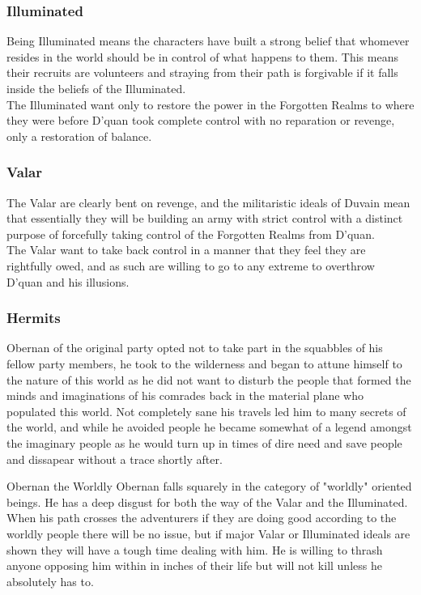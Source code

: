 \documentclass[10pt,twoside,twocolumn]{article}
\begin{document}
\subsubsection{Illuminated}
Being Illuminated means the characters have built a strong belief that whomever resides in the world should be in control of what happens to them. This means their recruits are volunteers and straying from their path is forgivable if it falls inside the beliefs of the Illuminated.\\

The Illuminated want only to restore the power in the Forgotten Realms to where they were before D'quan took complete control with no reparation or revenge, only a restoration of balance.\\

\subsubsection{Valar}
The Valar are clearly bent on revenge, and the militaristic ideals of Duvain mean that essentially they will be building an army with strict control with a distinct purpose of forcefully taking control of the Forgotten Realms from D'quan.\\

The Valar want to take back control in a manner that they feel they are rightfully owed, and as such are willing to go to any extreme to overthrow D'quan and his illusions.\\

\subsubsection{Hermits}
Obernan of the original party opted not to take part in the squabbles of his fellow party members, he took to the wilderness and began to attune himself to the nature of this world as he did not want to disturb the people that formed the minds and imaginations of his comrades back in the material plane who populated this world. Not completely sane his travels led him to many secrets of the world, and while he avoided people he became somewhat of a legend amongst the imaginary people as he would turn up in times of dire need and save people and dissapear without a trace shortly after.\\

\begin{commentbox}{Obernan the Worldly}
Obernan falls squarely in the category of "worldly" oriented beings. He has a deep disgust for both the way of the Valar and the Illuminated. When his path crosses the adventurers if they are doing good according to the worldly people there will be no issue, but if major Valar or Illuminated ideals are shown they will have a tough time dealing with him. He is willing to thrash anyone opposing him within in inches of their life but will not kill unless he absolutely has to.
\end{commentbox}
\end{document}

